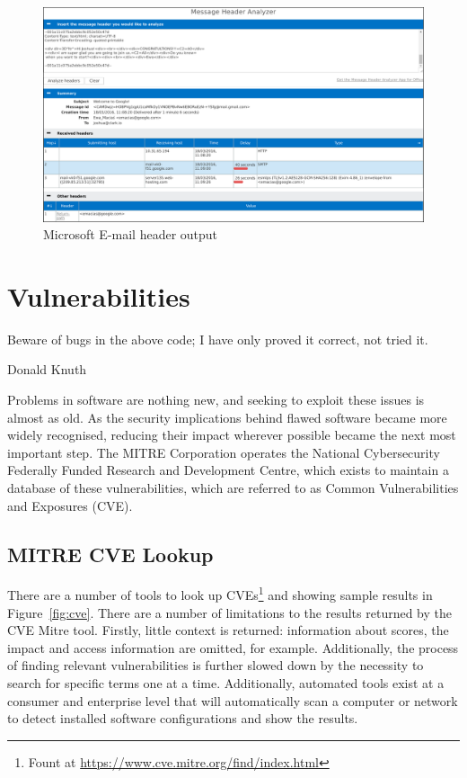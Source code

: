 \begin{figure}

	\centering \includegraphics[width=0.9\linewidth]{microsoft-header}

\caption{Microsoft E-mail header output} \label{fig:mic}\end{figure}

\section{Vulnerabilities}

\epigraph{Beware of bugs in the above code; I have only proved it correct, not tried it.}{Donald Knuth}

Problems in software are nothing new, and seeking to exploit these issues is
almost as old.   As the security implications behind flawed software became more
widely recognised, reducing their impact wherever possible became the next most
important step.  The MITRE Corporation operates the National Cybersecurity
Federally Funded Research and Development Centre, which exists to maintain a
database of these vulnerabilities, which are referred to as Common
Vulnerabilities and Exposures (CVE).

\subsection{MITRE CVE Lookup}\label{sec:mit}

There are a number of tools to look up CVEs\footnote{Fount at
	\url{https://www.cve.mitre.org/find/index.html}} and showing sample
results in Figure~\ref{fig:cve}.  There are a number of limitations to the
results returned by the CVE Mitre tool.  Firstly, little context is returned:
information about scores, the impact and access information are omitted, for
example.  Additionally, the process of finding relevant vulnerabilities is
further slowed down by the necessity to search for specific terms one at a
time.  Additionally, automated tools exist at a consumer and enterprise level
that will automatically scan a computer or network to detect installed software
configurations and show the results.

